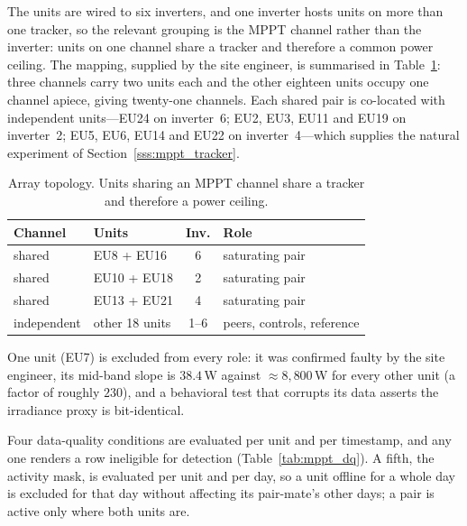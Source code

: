 The units are wired to six inverters, and one inverter hosts units on more than one tracker, so the relevant grouping is the MPPT channel rather than the inverter: units on one channel share a tracker and therefore a common power ceiling. The mapping, supplied by the site engineer, is summarised in Table~\ref{tab:mppt_topology}: three channels carry two units each and the other eighteen units occupy one channel apiece, giving twenty-one channels. Each shared pair is co-located with independent units---EU24 on inverter~6; EU2, EU3, EU11 and EU19 on inverter~2; EU5, EU6, EU14 and EU22 on inverter~4---which supplies the natural experiment of Section~\ref{sss:mppt_tracker}.

\begin{table}[!t]
  \renewcommand{\arraystretch}{1.3}
  \centering
  \caption{Array topology. Units sharing an MPPT channel share a tracker and
therefore a power ceiling.}
  \label{tab:mppt_topology}
  \small
  \setlength{\tabcolsep}{5pt}
  \begin{tabular}{@{}llcl@{}}
    \toprule
    Channel & Units & Inv. & Role \\
    \midrule
    shared      & EU8 + EU16   & 6 & saturating pair \\
    shared      & EU10 + EU18  & 2 & saturating pair \\
    shared      & EU13 + EU21  & 4 & saturating pair \\
    independent & other 18 units & 1--6 & peers, controls, reference \\
    \bottomrule
  \end{tabular}
\end{table}

One unit (EU7) is excluded from every role: it was confirmed faulty by the site engineer, its mid-band slope is $38.4$\,W against $\approx\!8{,}800$\,W for every other unit (a factor of roughly $230$), and a behavioral test that corrupts its data asserts the irradiance proxy is bit-identical.

Four data-quality conditions are evaluated per unit and per timestamp, and any one renders a row ineligible for detection (Table~\ref{tab:mppt_dq}). A fifth, the activity mask, is evaluated per unit and per day, so a unit offline for a whole day is excluded for that day without affecting its pair-mate's other days; a pair is active only where both units are.

